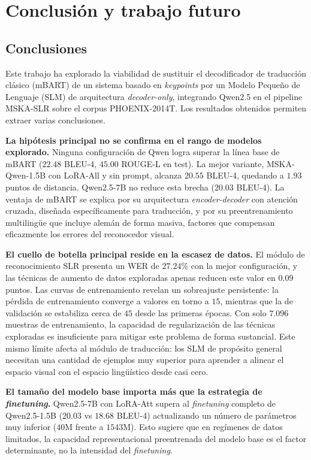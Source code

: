 \chapter{Conclusión y trabajo futuro}\label{ch:conclusion}

\section{Conclusiones}

Este trabajo ha explorado la viabilidad de sustituir el decodificador de traducción clásico (mBART) de un sistema basado en \textit{keypoints} por un Modelo Pequeño de Lenguaje (SLM) de arquitectura \textit{decoder-only}, integrando Qwen2.5 en el pipeline MSKA-SLR sobre el corpus PHOENIX-2014T\@.
Los resultados obtenidos permiten extraer varias conclusiones.

\textbf{La hipótesis principal no se confirma en el rango de modelos explorado.}
Ninguna configuración de Qwen logra superar la línea base de mBART ($22.48$ BLEU-4, $45.00$ ROUGE-L en test).
La mejor variante, MSKA-Qwen-1.5B con LoRA-All y sin prompt, alcanza $20.55$ BLEU-4, quedando a $1.93$ puntos de distancia.
Qwen2.5-7B no reduce esta brecha ($20.03$ BLEU-4).
La ventaja de mBART se explica por su arquitectura \textit{encoder-decoder} con atención cruzada, diseñada específicamente para traducción, y por su preentrenamiento multilingüe que incluye alemán de forma masiva, factores que compensan eficazmente los errores del reconocedor visual.

\textbf{El cuello de botella principal reside en la escasez de datos.}
El módulo de reconocimiento SLR presenta un WER de $27.24\%$ con la mejor configuración, y las técnicas de aumento de datos exploradas apenas reducen este valor en $0.09$ puntos.
Las curvas de entrenamiento revelan un sobreajuste persistente: la pérdida de entrenamiento converge a valores en torno a $15$, mientras que la de validación se estabiliza cerca de $45$ desde las primeras épocas.
Con solo $7.096$ muestras de entrenamiento, la capacidad de regularización de las técnicas exploradas es insuficiente para mitigar este problema de forma sustancial.
Este mismo límite afecta al módulo de traducción: los SLM de propósito general necesitan una cantidad de ejemplos muy superior para aprender a alinear el espacio visual con el espacio lingüístico desde casi cero.

\textbf{El tamaño del modelo base importa más que la estrategia de \textit{finetuning}.}
Qwen2.5-7B con LoRA-Att supera al \textit{finetuning} completo de Qwen2.5-1.5B ($20.03$ vs $18.68$ BLEU-4) actualizando un número de parámetros muy inferior ($40$M frente a
$1543$M).
Esto sugiere que en regímenes de datos limitados, la capacidad representacional preentrenada del modelo base es el factor determinante, no la intensidad del \textit{finetuning}.

